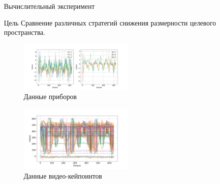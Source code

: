 \documentclass{beamer}
\begin{document}
	\begin{frame}{Вычислительный эксперимент}
		\begin{alertblock}{Цель}
			Сравнение различных стратегий снижения размерности целевого пространства.
		\end{alertblock}
		
		
		\begin{multicols}{2}
		\begin{figure}
			\includegraphics[width=0.5\textwidth]{cyclic_devices_data.png}
			\caption{Данные приборов}
		\end{figure}
	
		\begin{figure}[bhtp]
			\includegraphics[width=0.5\textwidth]{cyclic_video_data.png}
			\caption{Данные видео-кейпоинтов}
		\end{figure}
		\end{multicols}
		
	\end{frame}
\end{document}
